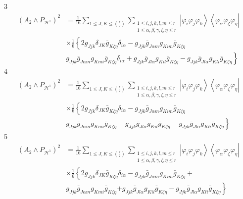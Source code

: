 \documentclass[aps,preprint]{revtex4}%
\begin{document}
3%
\begin{align}
\left(  A_{2}\wedge P_{\mathcal{H}^{1}}\right)  ^{2} &  =\frac{1}{16}%
\sum_{1\leq J,K\leq\binom{r}{2}}\sum_{\substack{1\leq i,j,k,l,m\leq
r\\1\leq\alpha,\beta,\gamma,\zeta,\eta\leq r}}\left\vert \varphi_{i}%
\varphi_{j}\varphi_{k}\right\rangle \left\langle \varphi_{\alpha}%
\varphi_{\zeta}\varphi_{\eta}\right\vert \\
&  \times\frac{1}{6}\left\{  2g_{Jjk}\delta_{JK}\bar{g}_{K\zeta\eta}%
\delta_{i\alpha}-g_{Jjk}\bar{g}_{J\alpha m}g_{Kim}\bar{g}_{K\zeta\eta}\right.
\\
&  g_{Jjk}\bar{g}_{J\alpha m}g_{Kmi}\bar{g}_{K\zeta\eta}\left.  \delta
_{i\alpha}+g_{Jjk}\bar{g}_{Jl\alpha}g_{Kil}\bar{g}_{K\zeta\eta}-g_{Jjk}\bar
{g}_{Jl\alpha}g_{Kli}\bar{g}_{K\zeta\eta}\right\}
\end{align}
4%
\begin{align}
\left(  A_{2}\wedge P_{\mathcal{H}^{1}}\right)  ^{2} &  =\frac{1}{16}%
\sum_{1\leq J,K\leq\binom{r}{2}}\sum_{\substack{1\leq i,j,k,l,m\leq
r\\1\leq\alpha,\beta,\gamma,\zeta,\eta\leq r}}\left\vert \varphi_{i}%
\varphi_{j}\varphi_{k}\right\rangle \left\langle \varphi_{\alpha}%
\varphi_{\zeta}\varphi_{\eta}\right\vert \\
&  \times\frac{1}{6}\left\{  2g_{Jjk}\delta_{JK}\bar{g}_{K\zeta\eta}%
\delta_{i\alpha}-g_{Jjk}\bar{g}_{J\alpha m}g_{Kim}\bar{g}_{K\zeta\eta}\right.
\\
&  \left.  g_{Jjk}\bar{g}_{J\alpha m}g_{Kmi}\bar{g}_{K\zeta\eta}+g_{Jjk}%
\bar{g}_{Jl\alpha}g_{Kil}\bar{g}_{K\zeta\eta}-g_{Jjk}\bar{g}_{Jl\alpha}%
g_{Kli}\bar{g}_{K\zeta\eta}\right\}
\end{align}
5%
\begin{align}
\left(  A_{2}\wedge P_{\mathcal{H}^{1}}\right)  ^{2} &  =\frac{1}{16}%
\sum_{1\leq J,K\leq\binom{r}{2}}\sum_{\substack{1\leq i,j,k,l,m\leq
r\\1\leq\alpha,\beta,\gamma,\zeta,\eta\leq r}}\left\vert \varphi_{i}%
\varphi_{j}\varphi_{k}\right\rangle \left\langle \varphi_{\alpha}%
\varphi_{\zeta}\varphi_{\eta}\right\vert \\
&  \times\frac{1}{6}\left\{  2g_{Jjk}\delta_{JK}\bar{g}_{K\zeta\eta}%
\delta_{i\alpha}-g_{Jjk}\bar{g}_{J\alpha m}g_{Kim}\bar{g}_{K\zeta\eta
}+\right.  \\
&  g_{Jjk}\bar{g}_{J\alpha m}g_{Kmi}\bar{g}_{K\zeta\eta}\left.  +g_{Jjk}%
\bar{g}_{Jl\alpha}g_{Kil}\bar{g}_{K\zeta\eta}-g_{Jjk}\bar{g}_{Jl\alpha}%
g_{Kli}\bar{g}_{K\zeta\eta}\right\}
\end{align}
\end{document}
